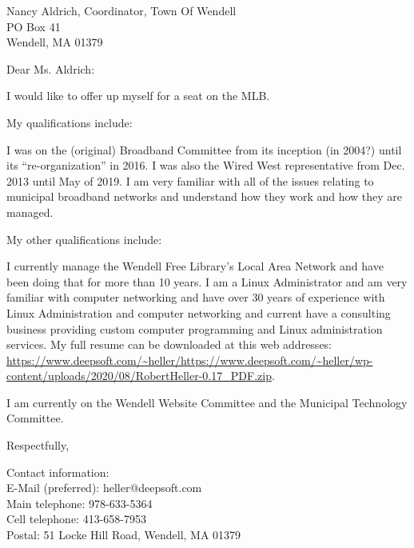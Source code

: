 \documentclass[12pt,twoside]{letter}
\begin{document}
\begin{letter}{Nancy Aldrich, Coordinator, Town Of Wendell\\PO Box 41\\ Wendell, MA 01379}
\opening{Dear Ms. Aldrich:}

I would like to offer up myself for a seat on the MLB.

My qualifications include:

I was on the (original) Broadband Committee from its inception (in 2004?)
until its ``re-organization'' in 2016. I was also the Wired West representative
from Dec. 2013 until May of 2019.  I am very familiar with all of the issues 
relating to municipal broadband networks and understand how they work and how 
they are managed.

My other qualifications include:

I currently manage the Wendell Free Library's Local Area Network and have been
doing that for more than 10 years. I am a Linux Administrator and am very
familiar with computer networking and have over 30 years of experience with
Linux Administration and computer networking and current have a consulting
business providing custom computer programming and Linux administration
services. My full resume can be downloaded at this web addresses:
\url{https://www.deepsoft.com/~heller/https://www.deepsoft.com/~heller/wp-content/uploads/2020/08/RobertHeller-0.17_PDF.zip}.

I am currently on the Wendell Website Committee and the Municipal Technology
Committee.


\closing{Respectfully,}
Contact information:\\
E-Mail (preferred): heller@deepsoft.com\\
Main telephone:    978-633-5364\\
Cell telephone:    413-658-7953\\
Postal:            51 Locke Hill Road, Wendell, MA 01379
\end{letter}
\end{document}
